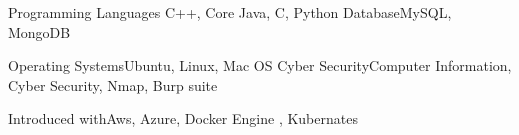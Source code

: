 \begin{cvskills}
	\cvskill
   	{Programming Languages}	{C++, Core Java, C, Python}
     \cvskill
     {Database}{MySQL, MongoDB}
     
     \cvskill
     {Operating Systems}{Ubuntu, Linux, Mac OS}
     \cvskill
     {Cyber Security}{Computer Information, Cyber Security, Nmap, Burp suite}
      
     \cvskill
     {Introduced with}{Aws, Azure, Docker Engine , Kubernates}
     
     
    \vspace{-8mm}
\end{cvskills}
